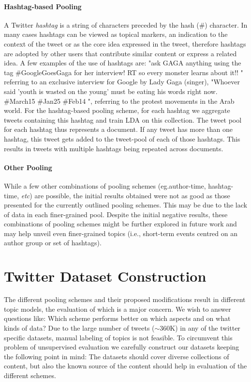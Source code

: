 \documentclass{sig-alternate}
\begin{document}
\paragraph{Hashtag-based Pooling}
A Twitter \textit{hashtag} is a string of characters preceded by the
hash (\#) character. In many cases hashtags can be viewed as topical
markers, an indication to the context of the tweet or as the core idea
expressed in the tweet, therefore hashtags are adopted by other users
that contribute similar content or express a related idea. A few
examples of the use of hashtags are: "ask GAGA anything using the tag
\#GoogleGoesGaga for her interview! RT so every monster learns about
it!! " referring to an exclusive interview for Google by Lady Gaga
(singer), "Whoever said 'youth is wasted on the young' must be eating
his words right now. \#March15 \#Jan25 \#Feb14 ", referring to the
protest movements in the Arab world.  For the hashtag-based pooling
scheme, for each hashtag we aggregate tweets containing this hashtag
and train LDA on this collection.  The tweet pool for each hashtag
thus represents a document. If any tweet has more than one hashtag,
this tweet gets added to the tweet-pool of each of those
hashtags. This results in tweets with multiple hashtags being repeated
across documents.

\paragraph{Other Pooling}
While a few other combinations of pooling schemes (eg.author-time,
hashtag-time, \textit{etc}) are possible, the initial results obtained
were not as good as those presented for the currently outlined
pooling schemes.  This may be due to the lack of data in each
finer-grained pool.  Despite the initial negative results, these 
combinations of pooling schemes might be further explored in future 
work and may help unveil even finer-grained topics (i.e., short-term 
events centred on an author group or set of hashtags).


\section{Twitter Dataset Construction}

\label{sec:dataset}

The different pooling schemes and their proposed modifications result
in different topic models, the evaluation of which is a major
concern. We wish to answer questions like: Which scheme performs
better on which aspects and on what kinds of data? Due to the large
number of tweets ($\sim$360K) in any of the twitter specific datasets,
manual labeling of topics is not feasible.  To circumvent this
problem of unsupervised evaluation we carefully construct our datasets
keeping the following point in mind: The datasets should cover diverse
collections of content, but also the known source of the content
should help in evaluation of the different schemes.
\end{document}

